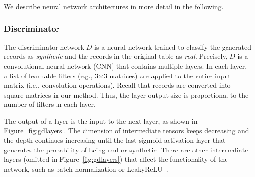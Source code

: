 We describe neural network architectures in more detail in the following.

\subsubsection{Discriminator}
The discriminator network $D$ is a neural network trained to classify the generated records as \textit{synthetic} and the records in the original table as \textit{real}. 
Precisely, $D$ is a convolutional neural network (CNN) that contains multiple layers. In each layer, a list of learnable filters (e.g., 3$\times$3 matrices) are applied to the entire input matrix (i.e., convolution operations). Recall that records are converted into square matrices in our method. Thus, the layer output size is proportional to the number of filters in each layer.

The output of a layer is the input to the next layer, as shown in Figure~\ref{fig:gdlayers}. The dimension of intermediate tensors keeps decreasing and the depth continues increasing until the last sigmoid activation layer that generates the probability of being real or synthetic. There are other intermediate layers (omitted in Figure~\ref{fig:gdlayers}) that affect the functionality of the network, such as batch normalization or LeakyReLU~\cite{radford_dcgan_2015}.


